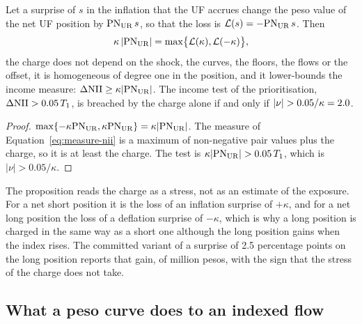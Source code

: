 \begin{proposition}
\label{prop:charge}
Let a surprise of $s$ in the inflation that the UF accrues change the peso value of the net UF position by $\mathrm{PN}_{\mathrm{UR}}\,s$, so that the loss is $\mathcal L(s)=-\mathrm{PN}_{\mathrm{UR}}\,s$. Then
\begin{equation}
\kappa\,|\mathrm{PN}_{\mathrm{UR}}|=\max\bigl\{\mathcal L(\kappa),\mathcal L(-\kappa)\bigr\},
\label{eq:charge}
\end{equation}
the charge does not depend on the shock, the curves, the floors, the flows or the offset, it is homogeneous of degree one in the position, and it lower-bounds the income measure: $\Delta\mathrm{NII}\ge\kappa|\mathrm{PN}_{\mathrm{UR}}|$. The income test of the prioritisation, $\Delta\mathrm{NII}>0.05\,T_1$, is breached by the charge alone if and only if $|\nu|>0.05/\kappa=\floorBreakNu$.
\end{proposition}
\begin{proof}
$\max\{-\kappa\mathrm{PN}_{\mathrm{UR}},\kappa\mathrm{PN}_{\mathrm{UR}}\}=\kappa|\mathrm{PN}_{\mathrm{UR}}|$. The measure of Equation~\eqref{eq:measure-nii} is a maximum of non-negative pair values plus the charge, so it is at least the charge. The test is $\kappa|\PNUR|>0.05\,T_1$, which is $|\nu|>0.05/\kappa$.
\end{proof}

The proposition reads the charge as a stress, not as an estimate of the exposure. For a net short position it is the loss of an inflation surprise of $+\kappa$, and for a net long position the loss of a deflation surprise of $-\kappa$, which is why a long position is charged in the same way as a short one although the long position gains when the index rises. The committed variant of a surprise of 2.5 percentage points on the long position reports that gain, of \repCpiEffect{} million pesos, with the sign that the stress of the charge does not take.

\subsection{What a peso curve does to an indexed flow}
\label{sec:theory-curve}

